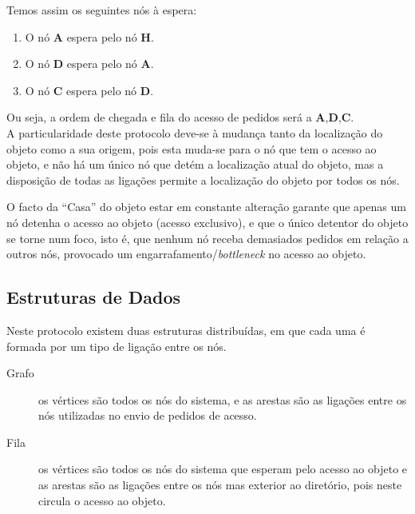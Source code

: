 Temos assim os seguintes nós à espera:
\begin{enumerate}
    \item O nó \textbf{A} espera pelo nó \textbf{H}.
    \item O nó \textbf{D} espera pelo nó \textbf{A}.
    \item O nó \textbf{C} espera pelo nó \textbf{D}.
\end{enumerate}
Ou seja, a ordem de chegada e fila do acesso de pedidos será a \textbf{A},\textbf{D},\textbf{C}. \\


 

A particularidade deste protocolo deve-se à mudança tanto da localização do objeto como a sua origem, pois esta muda-se para o nó que tem o acesso ao objeto, e não há um único nó que detém a localização atual do objeto, mas a disposição de todas as ligações permite a localização do objeto por todos os nós.

O facto da ``Casa'' do objeto estar em constante alteração garante que apenas um nó detenha o acesso ao objeto (acesso exclusivo), e que o único detentor do objeto se torne num foco, isto é, que nenhum nó receba demasiados pedidos em relação a outros nós, provocado um engarrafamento/\emph{bottleneck} no acesso ao objeto.


\subsection*{Estruturas de Dados}
Neste protocolo existem duas estruturas distribuídas, em que cada uma é formada por um tipo de ligação entre os nós.

\begin{description} 
    \item [Grafo] os vértices são todos os nós do sistema, e as arestas são as ligações entre os nós utilizadas no envio de pedidos de acesso.
    \item [Fila] os vértices são todos os nós do sistema que esperam pelo acesso ao objeto  e as arestas são as ligações entre os nós mas exterior ao diretório, pois neste circula o acesso ao objeto.
\end{description}

